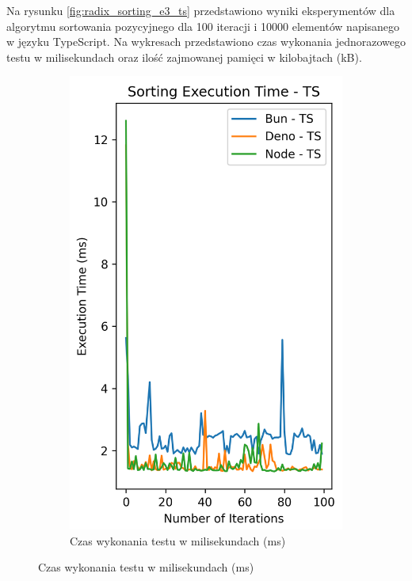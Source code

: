 Na rysunku \ref{fig:radix_sorting_e3_ts} przedstawiono wyniki eksperymentów dla algorytmu sortowania pozycyjnego dla 100 iteracji i 10000 elementów napisanego w języku TypeScript. Na wykresach przedstawiono czas wykonania jednorazowego testu w milisekundach oraz ilość zajmowanej pamięci w kilobajtach (kB).

\begin{figure}[H]
  \centering
  \begin{subfigure}[b]{0.44\textwidth}
    \centering
    \includegraphics[width=\textwidth]{Figures/sorting/sorting_radix_100_10000_ts_time.png}
    \caption{Czas wykonania testu w milisekundach (ms)}

\end{subfigure}
\end{figure}
